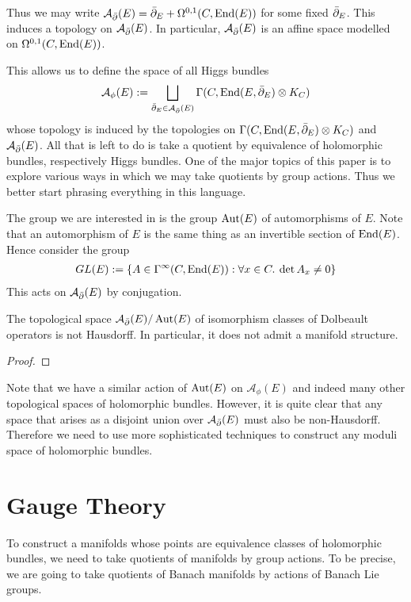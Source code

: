 \documentclass[12pt]{ociamthesis}  %
\begin{document}
Thus we may write $\mathcal A_{\bar{\partial}} (E) = \bar{\partial}_E + \Omega^{0,1}(C,\operatorname{End}(E))$
for some fixed $\bar{\partial}_E$. This induces a topology on $\mathcal A_{\bar{\partial}} (E)$.
In particular, $\mathcal A_{\bar{\partial}} (E)$ is an affine space modelled on
$\Omega^{0,1}(C,\operatorname{End}(E))$.

This allows us to define the space of all Higgs bundles
\begin{align*}
  \mathcal A_\phi(E) := \bigsqcup_{\bar{\partial}_E \in \mathcal A_{\bar{\partial}} (E)} \Gamma(C,\operatorname{End}(E,\bar{\partial}_E)\otimes K_C)
\end{align*}
whose topology is induced by the topologies on
$\Gamma(C,\operatorname{End}(E,\bar{\partial}_E)\otimes K_C)$ and $\mathcal A_{\bar{\partial}} (E)$.
All that is left to do is take a quotient by equivalence of holomorphic
bundles, respectively Higgs bundles. One of the major topics of this
paper is to explore various ways in which we may take quotients by
group actions. Thus we better start phrasing everything in this language.

The group we are interested in is the group $\operatorname{Aut}(E)$ of automorphisms
of $E$. Note that an automorphism of $E$ is the same thing as
an invertible section of $\operatorname{End}(E)$. Hence consider the group
\begin{align*}
  GL(E) := \{A \in \Gamma^\infty(C,\operatorname{End}(E)) : \forall x \in C.\:\det A_x \neq 0\}
\end{align*}
This acts on $\mathcal A_{\bar{\partial}}(E)$ by conjugation.
\begin{lemma}
  The topological space $\mathcal A_{\bar{\partial}} (E)/\operatorname{Aut}(E)$ of isomorphism classes of
  Dolbeault operators is not Hausdorff. In particular, it does not
  admit a manifold structure.
  \begin{proof}
    \missingproof
  \end{proof}
\end{lemma}

Note that we have a similar action of $\operatorname{Aut}(E)$ on $\mathcal A_\phi(E)$ and
indeed many other topological spaces of holomorphic bundles. However,
it is quite clear that any space that arises as a disjoint union
over $\mathcal A_{\bar{\partial}} (E)$ must also be non-Hausdorff. Therefore we need
to use more sophisticated techniques to construct any moduli
space of holomorphic bundles.

\section{Gauge Theory}

To construct a manifolds whose points are equivalence classes of
holomorphic bundles, we need to take quotients of manifolds by
group actions. To be precise, we are going to take quotients of
Banach manifolds by actions of Banach Lie groups.
\end{document}
